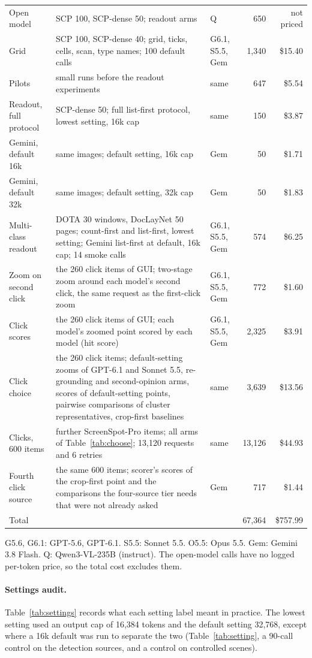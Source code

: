 \begin{longtable}{@{}>{\raggedright\arraybackslash}p{3.0cm}>{\raggedright\arraybackslash}p{6.35cm}>{\raggedright\arraybackslash}p{2.3cm}rr@{}}
Open model & SCP 100, SCP-dense 50; readout arms & Q & 650 & not priced \\
Grid & SCP 100, SCP-dense 40; grid, ticks, cells, scan, type names; 100 default calls & G6.1, S5.5, Gem & 1,340 & \$15.40 \\
Pilots & small runs before the readout experiments & same & 647 & \$5.54 \\
Readout, full protocol & SCP-dense 50; full list-first protocol, lowest setting, 16k cap & same & 150 & \$3.87 \\
\quad Gemini, default 16k & same images; default setting, 16k cap & Gem & 50 & \$1.71 \\
\quad Gemini, default 32k & same images; default setting, 32k cap & Gem & 50 & \$1.83 \\
Multi-class readout & DOTA 30 windows, DocLayNet 50 pages; count-first and list-first, lowest setting; Gemini list-first at default, 16k cap; 14 smoke calls & G6.1, S5.5, Gem & 574 & \$6.25 \\
Zoom on second click & the 260 click items of GUI; two-stage zoom around each model's second click, the same request as the first-click zoom & G6.1, S5.5, Gem & 772 & \$1.60 \\
Click scores & the 260 click items of GUI; each model's zoomed point scored by each model (hit score) & G6.1, S5.5, Gem & 2,325 & \$3.91 \\
Click choice & the 260 click items; default-setting zooms of GPT-6.1 and Sonnet 5.5, re-grounding and second-opinion arms, scores of default-setting points, pairwise comparisons of cluster representatives, crop-first baselines & same & 3,639 & \$13.56 \\
Clicks, 600 items & 600 further ScreenSpot-Pro items; all arms of Table~\ref{tab:choose}; 13,120 requests and 6 retries & same & 13,126 & \$44.93 \\
Fourth click source & the same 600 items; scorer's scores of the crop-first point and the comparisons the four-source tier needs that were not already asked & Gem & 717 & \$1.44 \\\midrule
Total & & & 67,364 & \$757.99 \\\bottomrule
\end{longtable}
\noindent G5.6, G6.1: GPT-5.6, GPT-6.1. S5.5: Sonnet 5.5. O5.5: Opus 5.5. Gem: Gemini 3.8 Flash. Q: Qwen3-VL-235B (instruct). The open-model calls have no logged per-token price, so the total cost excludes them.

\paragraph{Settings audit.}\label{app:settings} Table~\ref{tab:settings} records what each setting label meant in practice. The lowest setting used an output cap of 16,384 tokens and the default setting 32,768, except where a 16k default was run to separate the two (Table~\ref{tab:setting}, a 90-call control on the detection sources, and a control on controlled scenes).

